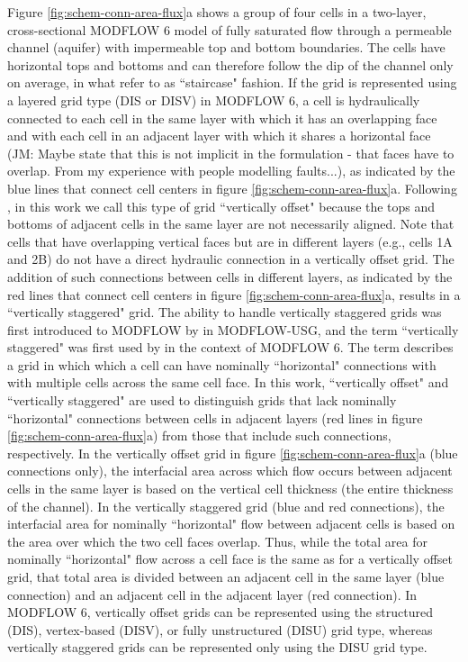 \documentclass{article}
\begin{document}
Figure \ref{fig:schem-conn-area-flux}a shows a group of four cells in a two-layer, cross-sectional MODFLOW 6 model of fully saturated flow through a permeable channel (aquifer) with impermeable top and bottom boundaries. The cells have horizontal tops and bottoms and can therefore follow the dip of the channel only on average, in what \cite{bardot2022} refer to as ``staircase" fashion. If the grid is represented using a layered grid type (DIS or DISV) in MODFLOW 6, a cell is hydraulically connected to each cell in the same layer with which it has an overlapping face and with each cell in an adjacent layer with which it shares a horizontal face {\color{red} (JM: Maybe state that this is not implicit in the formulation - that faces have to overlap. From my experience with people modelling faults...)}, as indicated by the blue lines that connect cell centers in figure \ref{fig:schem-conn-area-flux}a. Following \cite{bardot2022}, in this work we call this type of grid ``vertically offset" because the tops and bottoms of adjacent cells in the same layer are not necessarily aligned. Note that cells that have overlapping vertical faces but are in different layers (e.g., cells 1A and 2B) do not have a direct hydraulic connection in a vertically offset grid. The addition of such connections between cells in different layers, as indicated by the red lines that connect cell centers in figure \ref{fig:schem-conn-area-flux}a, results in a ``vertically staggered" grid. The ability to handle vertically staggered grids was first introduced to MODFLOW by \cite{modflowusg} in MODFLOW-USG, and the term ``vertically staggered" was first used by \cite{modflow6gwf} in the context of MODFLOW 6. The term describes a grid in which which a cell can have nominally ``horizontal" connections with with multiple cells across the same cell face. In this work, ``vertically offset" and ``vertically staggered" are used to distinguish grids that lack nominally ``horizontal" connections between cells in adjacent layers (red lines in figure \ref{fig:schem-conn-area-flux}a) from those that include such connections, respectively.  In the vertically offset grid in figure \ref{fig:schem-conn-area-flux}a (blue connections only), the interfacial area across which flow occurs between adjacent cells in the same layer is based on the vertical cell thickness (the entire thickness of the channel). In the vertically staggered grid (blue and red connections), the interfacial area for nominally ``horizontal" flow between adjacent cells is based on the area over which the two cell faces overlap. Thus, while the total area for nominally ``horizontal" flow across a cell face is the same as for a vertically offset grid, that total area is divided between an adjacent cell in the same layer (blue connection) and an adjacent cell in the adjacent layer (red connection). In MODFLOW 6, vertically offset grids can be represented using the structured (DIS), vertex-based (DISV), or fully unstructured (DISU) grid type, whereas vertically staggered grids can be represented only using the DISU grid type.
\end{document}
